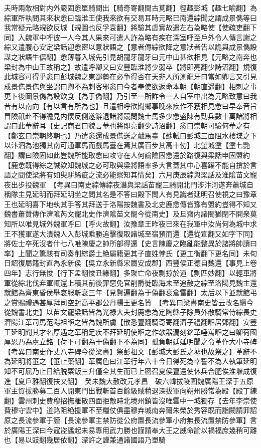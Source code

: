 夫時兩敵相對内外嚴固悆單騎間出【騎奇寄翻間古莧翻】徑趣彭城【趣七喻翻】為綜軍所執問其來狀悆曰臨淮王使我來欲有交易耳時元略已南還綜聞之謂成景儁等曰我常疑元略規欲反城【規圖也反孚袁翻】將驗其虚實故遣左右為略使【使疏吏翻下同】入魏軍中呼彼一人今其人果來可遣人詐為略有疾在深室呼至戶外令人傳言謝之綜又遣腹心安定梁話迎悆密以意狀語之【意者傳綜欲降之意狀者告以詭與成景儁設謀之狀語牛倨翻】悆薄暮入城先引見胡龍牙龍牙曰元中山甚欲相見【元略之南奔也梁封為中山王故稱之】故遣呼卿又曰安豐臨淮將少弱卒【將即亮翻少詩沼翻】規復此城容可得乎悆曰彭城魏之東鄙勢在必争得否在天非人所測龍牙曰當如卿言又引見成景儁景儁與坐謂曰卿不為刺客邪悆曰今者奉使欲返命本朝【朝直遥翻】相刺之事更卜後圖景儁為設飲食【為于偽翻】乃引至一所詐令一人自室中出為元略致意曰我昔有以南向【有以言有所為也】且遣相呼欲聞鄉事晚來疾作不獲相見悆曰早奉音旨冒險祇赴不得瞻見内懷反側遂辭退諸將競問魏士馬多少悆盛陳有勁兵數十萬諸將相謂曰此華辭耳【史記商君曰貌言華也將即亮翻少詩沼翻】悆曰崇朝可驗何華之有【鄭玄曰崇朝終朝也】乃遣悆還成景儁送之戲馬臺【蘇軾曰彭城三面阻水樓堞之下以汴泗為池獨其南可通軍馬而戲馬臺在焉其廣百步其高十仞】北望城壍【壍七艷翻】謂曰險固如此豈魏所能取悆曰攻守在人何論險固悆還於路復與梁話申固盟約【鹿悆既得綜之誠欵知魏城之必可取與梁將語率多大言蓋其中心喜躍不能自揜於言語之間使梁將有如臾駢絺疵之流必能察知其情矣】六月庚辰綜與梁話及淮隂苗文寵夜出步投魏軍　【考異曰南史綜傳綜夜潛與梁話苗寵三騎開北門涉汴河遂奔蕭城自稱隊主見延明而拜延明坐之問其名是不答曰殿下問人有見識者延明召使視之曰豫章王也延明喜下地執其手答其拜送于洛陽按魏書及北史鹿悆傳皆豫有盟約豈得不知又魏書蕭贊傳作濟隂芮文寵北史作濟隂苗文寵今從南史】及旦齋内諸閤猶閉不開衆莫知所以唯見城外魏軍呼曰【呼火故翻】汝豫章王昨夜已來在我軍中汝尚何為城中求王不獲軍遂大潰魏人入彭城乘勝追擊復取諸城至宿預而還【還從宣翻又如字下同】將佐士卒死沒者什七八唯陳慶之帥所部得還【史言陳慶之臨亂能整異於諸將帥讀曰率】上聞之驚駭有司奏削綜爵土絶屬籍更其子直姓悖氏【更工衡翻下更名同】未旬日詔復屬籍封直為永新侯【吳立永新縣宋屬安成郡】西豐侯正德自魏還【事見上卷四年】志行無悛【行下孟翻悛丑緣翻】多聚亡命夜剽掠於道【剽匹妙翻】以輕車將軍從綜北伐弃軍輒還上積其前後罪惡免官削爵徙臨海未至追赦之綜至洛陽見魏主還就館為齊東昏侯舉哀服斬衰三年【見賢遍翻為于偽翻衰倉雷翻】太后以下並就館弔之賞賜禮遇甚厚拜司空封高平郡公丹楊王更名贊　【考異曰梁書南史皆云改名纘今從魏書北史】以苗文寵梁話皆為光禄大夫封鹿悆為定陶縣子除員外散騎常侍綜長史濟陽江革司馬范陽祖暅之皆為魏所虜【散悉亶翻騎奇寄翻濟子禮翻暅居鄧翻】安豐王延明聞其才名厚遇之革稱足疾不拜延明使暅之作欹器漏刻銘革唾罵暅之曰卿荷國厚恩乃為虜立銘【荷下可翻為于偽翻下不為同】孤負朝廷延明聞之令革作大小寺碑　【考異曰南史作丈八寺碑今從梁書】祭彭祖文【彭城大彭氏之墟也故祭之】革辭不為延明將箠之【箠止蘂翻】革厲色曰江革行年六十今日得死為幸誓不為人執筆延明知不可屈乃止日給脱粟飯三升僅全其生而已上密召夏侯亶還使休兵合肥俟淮堰成復進【夏戶雅翻復扶又翻】　癸未魏大赦改元孝昌　破六韓拔陵圍魏廣陽王深于五原軍主賀拔勝募二百人開東門出戰斬首百餘級賊稍退深拔軍向朔州勝常為殿【殿丁練翻】雲州刺史費穆招撫離散四面拒敵時北境州鎮皆沒唯雲中一城獨存【去年李崇使費穆守雲中】道路阻絶援軍不至糧仗俱盡穆弃城南奔爾朱榮於秀容既而詣闕請罪詔原之長流參軍于謹【長流參軍主禁防從公府置長流參軍小府無長流置禁防參軍】言於廣陽王深曰今寇盜蠭起未易專用武力勝也謹請奉大王之威命諭以禍福庶幾稍可離也【易以豉翻幾居依翻】深許之謹兼通諸國語乃單騎